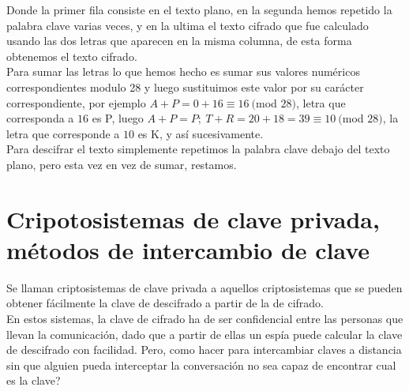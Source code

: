 \documentclass{report}
\begin{document}
Donde la primer fila consiste en el texto plano, en la segunda hemos repetido la palabra clave varias veces, y en la ultima el texto cifrado que fue calculado usando las dos letras que aparecen en la misma columna, de esta forma obtenemos el texto cifrado.\\Para sumar las letras lo que hemos hecho es sumar sus valores numéricos correspondientes modulo 28 y luego sustituimos este valor por su carácter correspondiente, por ejemplo $A+P=0+16\equiv 16\ ($mod $28)$, letra que corresponda a $16$ es P, luego $A+P=P;\ T+R=20+18=39\equiv 10\ ($mod $28)$, la letra que corresponde a $10$ es K, y así sucesivamente.\\Para descifrar el texto simplemente repetimos la palabra clave debajo del texto plano, pero esta vez en vez de sumar, restamos.
\newpage\section{Cripotosistemas de clave privada, métodos de intercambio de clave}
Se llaman criptosistemas de clave privada a aquellos criptosistemas que se pueden obtener fácilmente la clave de descifrado a partir de la de cifrado.
\\En estos sistemas, la clave de cifrado ha de ser confidencial entre las personas que llevan la comunicación, dado que a partir de ellas un espía puede calcular la clave de descifrado con facilidad. Pero, como hacer para intercambiar claves a distancia sin que alguien pueda interceptar la conversación no sea capaz de encontrar cual es la clave?
\end{document}
